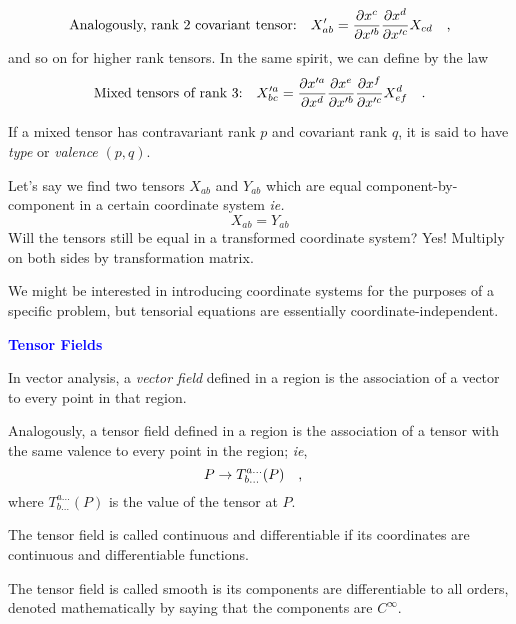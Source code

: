\documentclass[landscape,aspectratio=169]{slides}
\begin{document}
\begin{slide}
	\begin{equation*}\label{key}
	\qq{Analogously, rank $ 2 $ covariant tensor:} X'_{ab} = \pdv{x^c}{x'^b} \pdv{x^d}{x'^c} X_{cd} \qq{,}
	\end{equation*}
	and so on for higher rank tensors. In the same spirit, we can define  by the law
	\begin{equation*}\label{key}
	\qq{Mixed tensors of rank 3:}
	X'^{a}_{bc} =  \pdv{x'^a}{x^d} \pdv{x^e}{x'^b} \pdv{x^f}{x'^c} X^d_{ef} \qq{.} 
	\end{equation*}
	
	If a mixed tensor has contravariant rank $ p $ and covariant rank $ q $, it is said to have \textit{type}  or \textit{valence} $ (p,q) $.
\end{slide}

\begin{slide}	
	Let's say we find two tensors $ X_{ab} $ and $ Y_{ab} $ which are equal component-by-component in a certain coordinate system \textit{ie.} $$ X_{ab} = Y_{ab} $$Will the tensors still be equal in a transformed coordinate system? Yes! Multiply on both sides by transformation matrix.

	We might be interested in introducing coordinate systems for the purposes of a specific problem, but tensorial equations are essentially coordinate-independent.
	
\end{slide}

\begin{slide}
	\textcolor{blue}{\textbf{Tensor Fields}}
	
	In vector analysis, a \textit{vector field} defined in a region is the association of a vector to every point in that region.
	
	Analogously, a tensor field defined in a region is the association of a tensor with the same valence to every point in the region; \textit{ie},
	\begin{equation*}\label{key}
	P \rightarrow T^{a \ldots}_{b\ldots} (P) \qq{,}
	\end{equation*}
	where $  T^{a \ldots}_{b\ldots} (P) $ is the value of the tensor at $ P $.
	
	The tensor field is called continuous and differentiable if its coordinates are continuous and differentiable functions. 
	
	The tensor field is called smooth is its components are differentiable to all orders, denoted mathematically by saying that the components are $ C^\infty $.
	
\end{slide}
\end{document}
